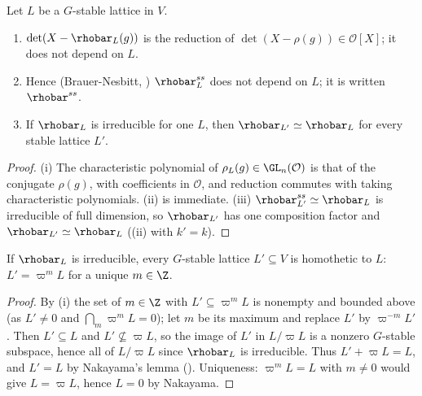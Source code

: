 \begin{proposition}\label{prop:reps:reduction-ss}
Let $L$ be a $G$-stable lattice in $V$.
\begin{enumerate}[label=(\roman*)]
\item $\det(X-\rhobar_L(g))$ is the reduction of $\det(X-\rho(g))\in\mathcal{O}[X]$; it does not depend on $L$.
\item Hence (Brauer-Nesbitt, ) $\rhobar_L^{ss}$ does not depend on $L$; it is written $\rhobar^{ss}$.
\item If $\rhobar_L$ is irreducible for one $L$, then $\rhobar_{L'}\simeq\rhobar_L$ for every stable lattice $L'$.
\end{enumerate}
\end{proposition}

\begin{proof}
(i) The characteristic polynomial of $\rho_L(g)\in\GL_n(\mathcal{O})$ is that of the conjugate $\rho(g)$, with coefficients in $\mathcal{O}$, and reduction commutes with
taking characteristic polynomials. (ii) is immediate. (iii) $\rhobar_{L'}^{ss}\simeq\rhobar_L$ is irreducible of full dimension, so $\rhobar_{L'}$ has one composition factor
and $\rhobar_{L'}\simeq\rhobar_L$ ((ii) with $k'=k$).
\end{proof}

\begin{theorem}\label{thm:reps:homothety}
If $\rhobar_L$ is irreducible, every $G$-stable lattice $L'\subseteq V$ is homothetic to $L$: $L'=\varpi^mL$ for a unique $m\in\Z$.
\end{theorem}

\begin{proof}
By (i) the set of $m\in\Z$ with $L'\subseteq\varpi^mL$ is nonempty and bounded above (as $L'\ne0$ and $\bigcap_m\varpi^mL=0$); let $m$ be its
maximum and replace $L'$ by $\varpi^{-m}L'$. Then $L'\subseteq L$ and $L'\not\subseteq\varpi L$, so the image of $L'$ in $L/\varpi L$ is a nonzero $G$-stable subspace,
hence all of $L/\varpi L$ since $\rhobar_L$ is irreducible. Thus $L'+\varpi L=L$, and $L'=L$ by Nakayama's lemma (). Uniqueness: $\varpi^mL=L$
with $m\ne0$ would give $L=\varpi L$, hence $L=0$ by Nakayama.
\end{proof}

